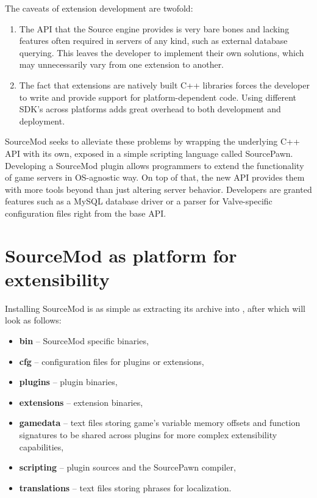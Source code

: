 The caveats of extension development are twofold:
\begin{enumerate}
\item
The API that the Source engine provides is very bare bones and lacking features often required in servers of any kind, such as external database querying.
This leaves the developer to implement their own solutions, which may unnecessarily vary from one extension to another.
\item
The fact that extensions are natively built C++ libraries forces the developer to write and provide support for platform-dependent code.
Using different SDK's across platforms adds great overhead to both development and deployment.
\end{enumerate}
SourceMod seeks to alleviate these problems by wrapping the underlying C++ API with its own, exposed in a simple scripting language called SourcePawn.
Developing a SourceMod plugin allows programmers to extend the functionality of game servers in OS-agnostic way.
On top of that, the new API provides them with more tools beyond than just altering server behavior.
Developers are granted features such as a MySQL database driver or a parser for Valve-specific configuration files right from the base API.

\section{SourceMod as platform for extensibility}

Installing SourceMod is as simple as extracting its archive into , after which  will look as follows:
\begin{itemize}
    \item \textbf{bin} -- SourceMod specific binaries,
    \item \textbf{cfg} -- configuration files for plugins or extensions,
    \item \textbf{plugins} -- plugin binaries,
    \item \textbf{extensions} -- extension binaries,
    \item \textbf{gamedata} -- text files storing game's variable memory offsets and function signatures to be shared across plugins for more complex extensibility capabilities,
    \item \textbf{scripting} -- plugin sources and the SourcePawn compiler,
    \item \textbf{translations} -- text files storing phrases for localization.
\end{itemize}

